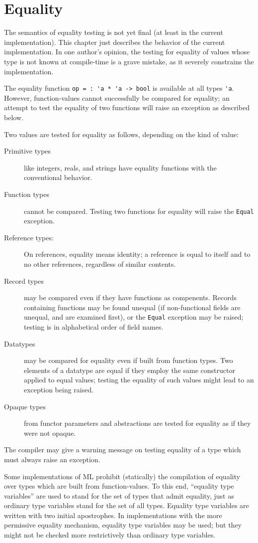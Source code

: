 \chapter{Equality}

The semantics of equality testing is not yet final (at least in the
current implementation).  This chapter just describes the behavior of
the current implementation.  In one author's opinion, the testing for
equality of values whose type is not known at compile-time is a grave
mistake, as it severely constrains the implementation.

The equality function \verb"op = : 'a * 'a -> bool" is available at
all types \verb"'a".  However, function-values cannot successfully be
compared for equality; an attempt to test the equality of two
functions will raise an exception as described below.

Two values are tested for equality as follows, depending on the kind
of value:
\begin{description}
\item[Primitive types] like integers, reals, and strings have
equality functions with the conventional behavior.

\item[Function types] cannot be compared.  Testing two functions for equality
will raise the \verb"Equal" exception.

\item[Reference types:] On references, equality means identity; a
reference is equal to itself and to no other references, regardless
of similar contents.

\item[Record types] may be compared even if they have functions as
compenents.  Records containing functions may be found unequal (if
non-functional fields are unequal, and are examined first), or
the \verb"Equal" exception may be raised; testing is in alphabetical
order of field names.

\item[Datatypes] may be compared for equality even if built from
function types.  Two elements of a datatype are equal if they employ
the same constructor applied to equal values; testing the equality of
such values might lead to an exception being raised.

\item[Opaque types] from functor parameters and abstractions are
tested for equality as if they were not opaque.
\end{description}

The compiler may give a warning message on testing equality of a type
which must always raise an exception.

Some implementations of ML prohibit (statically) the compilation of
equality over types which are built from function-values.  To this
end, ``equality type variables'' are used to stand for the set of
types that admit equality, just as ordinary type variables stand for
the set of all types.  Equality type variables are written with two
initial apostrophes.  In implementations with the more permissive
equality mechanism, equality type variables may be used; but they might not
be checked more restrictively than ordinary type variables.
